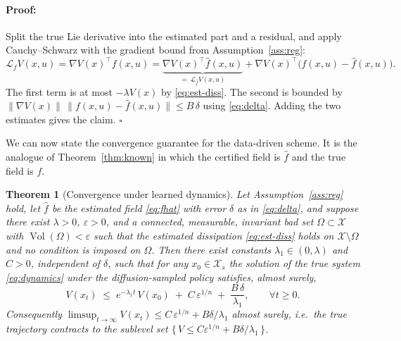 \documentclass{article}
\newenvironment{proof}{\paragraph{Proof:}}{\hfill$\square$}
\newcommand{\eps}{\varepsilon}
\newcommand{\Xs}{\mathcal{X}_s}
\newcommand{\Lie}[2]{\mathcal{L}_{#1} #2}
\newcommand{\hf}{\hat{f}}
\newcommand{\Vol}{\operatorname{Vol}}
\newtheorem{theorem}{Theorem}
\begin{document}
\begin{proof}
Split the true Lie derivative into the estimated part and a residual, and apply
Cauchy--Schwarz with the gradient bound from Assumption~\ref{ass:reg}:
\[
    \Lie{f}{V}(x,u)
    =\nabla V(x)^\top f(x,u)
    =\underbrace{\nabla V(x)^\top \hf(x,u)}_{=\,\Lie{\hf}{V}(x,u)}
    +\nabla V(x)^\top\bigl(f(x,u)-\hf(x,u)\bigr).
\]
The first term is at most $-\lambda V(x)$ by \eqref{eq:est-diss}. The second is
bounded by $\|\nabla V(x)\|\,\|f(x,u)-\hf(x,u)\|\le B\,\delta$ using
\eqref{eq:delta}. Adding the two estimates gives the claim.
\end{proof}

We can now state the convergence guarantee for the data-driven scheme. It is the
analogue of Theorem~\ref{thm:known} in which the certified field is $\hf$ and the
true field is $f$.

\begin{theorem}[Convergence under learned dynamics]
\label{thm:main}
Let Assumption~\ref{ass:reg} hold, let $\hf$ be the estimated field
\eqref{eq:fhat} with error $\delta$ as in \eqref{eq:delta}, and suppose there
exist $\lambda>0$, $\eps>0$, and a connected, measurable, invariant bad set
$\Omega\subset\mathcal{X}$ with $\Vol(\Omega)<\eps$ such that the estimated
dissipation \eqref{eq:est-diss} holds on $\mathcal{X}\setminus\Omega$ and no
condition is imposed on $\Omega$. Then there exist constants $\lambda_1\in(0,\lambda)$
and $C>0$, independent of $\delta$, such that for any $x_0\in\Xs$ the solution of
the true system \eqref{eq:dynamics} under the diffusion-sampled policy satisfies,
almost surely,
\begin{equation}
\label{eq:main-bound}
    V(x_t)\;\le\; e^{-\lambda_1 t}\,V(x_0)
    \;+\; C\,\eps^{1/n}
    \;+\; \frac{B\,\delta}{\lambda_1},
    \qquad \forall t\ge 0.
\end{equation}
Consequently $\displaystyle \limsup_{t\to\infty} V(x_t)\le C\,\eps^{1/n}+B\delta/\lambda_1$
almost surely, i.e.\ the true trajectory contracts to the sublevel set
$\{\,V\le C\eps^{1/n}+B\delta/\lambda_1\,\}$.
\end{theorem}
\end{document}
